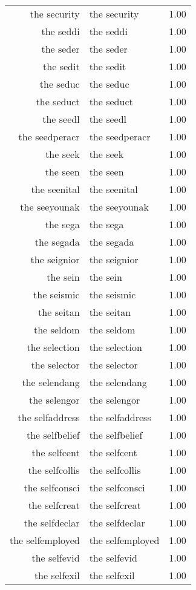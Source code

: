 \begin{table}[ht]
\begin{tabular}{rlr}
  the security & the security & 1.00 \\ 
  the seddi & the seddi & 1.00 \\ 
  the seder & the seder & 1.00 \\ 
  the sedit & the sedit & 1.00 \\ 
  the seduc & the seduc & 1.00 \\ 
  the seduct & the seduct & 1.00 \\ 
  the seedl & the seedl & 1.00 \\ 
  the seedperacr & the seedperacr & 1.00 \\ 
  the seek & the seek & 1.00 \\ 
  the seen & the seen & 1.00 \\ 
  the seenital & the seenital & 1.00 \\ 
  the seeyounak & the seeyounak & 1.00 \\ 
  the sega & the sega & 1.00 \\ 
  the segada & the segada & 1.00 \\ 
  the seignior & the seignior & 1.00 \\ 
  the sein & the sein & 1.00 \\ 
  the seismic & the seismic & 1.00 \\ 
  the seitan & the seitan & 1.00 \\ 
  the seldom & the seldom & 1.00 \\ 
  the selection & the selection & 1.00 \\ 
  the selector & the selector & 1.00 \\ 
  the selendang & the selendang & 1.00 \\ 
  the selengor & the selengor & 1.00 \\ 
  the selfaddress & the selfaddress & 1.00 \\ 
  the selfbelief & the selfbelief & 1.00 \\ 
  the selfcent & the selfcent & 1.00 \\ 
  the selfcollis & the selfcollis & 1.00 \\ 
  the selfconsci & the selfconsci & 1.00 \\ 
  the selfcreat & the selfcreat & 1.00 \\ 
  the selfdeclar & the selfdeclar & 1.00 \\ 
  the selfemployed & the selfemployed & 1.00 \\ 
  the selfevid & the selfevid & 1.00 \\ 
  the selfexil & the selfexil & 1.00 \\ 

\end{tabular}
\end{table}
